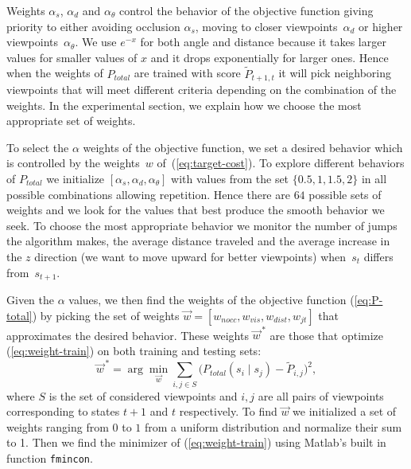 \documentclass[10pt,twocolumn,letterpaper]{article}
\begin{document}
Weights $\alpha_{s}$, $\alpha_{d}$ and $\alpha_{\theta}$ control the behavior of the objective function giving priority to either avoiding occlusion $\alpha_{s}$, moving to closer viewpoints~$\alpha_{d}$ or higher viewpoints~$\alpha_{\theta}$. 
We use $e^{-x}$ for both angle and distance because it takes larger values for smaller values of $x$ and it drops exponentially for larger ones. 
Hence when the weights of $P_{total}$ are trained with score $\tilde{P}_{t+1,t}$ it will pick neighboring viewpoints that will meet different criteria depending on the combination of the weights. 
In the experimental section, we explain how we choose the most appropriate set of weights.

To select the $\alpha$ weights of the objective function, we set a desired behavior which is controlled by the weights~$w$ of~(\ref{eq:target-cost}). 
To explore different behaviors of $P_{total}$ we initialize $[\alpha_{s}, \alpha_{d}, \alpha_{\theta}]$ with values from the set $\{0.5,1,1.5,2\}$ in all possible combinations allowing repetition. 
Hence there are $64$ possible sets of weights and we look for the values that best produce the smooth behavior we seek. 
To choose the most appropriate behavior we monitor the number of jumps the algorithm makes, the average distance traveled and the average increase in the $z$ direction (we want to move upward for better viewpoints) when~$s_{t}$ differs from~$s_{t+1}$. 

Given the $\alpha$ values, we then find the weights of the objective function  (\ref{eq:P-total}) by picking the set of weights $\vec{w}=[w_{nocc},w_{vis},w_{dist},w_{jt}]$ that approximates the desired behavior. 
These weights $\vec{w}^{\,\ast}$ are those that optimize (\ref{eq:weight-train}) on both training and testing sets:
\begin{equation} \label{eq:weight-train}
  \vec{w}^{\,\ast} =  
     \arg \min_{\vec{w}}\sum_{i,j \in S} 
     \big(P_{total}(s_i \mid s_j)-\tilde{P}_{i,j} \big)^2,
\end{equation}
where $S$ is the set of considered viewpoints and $i,j$ are all pairs of viewpoints corresponding to states $t+1$ and $t$ respectively. 
To find $\vec{w}$ we initialized a set of weights ranging from $0$ to $1$ from a uniform distribution and normalize their sum to 1. 
Then we find the minimizer of (\ref{eq:weight-train}) using Matlab's built in function \texttt{fmincon}.  
\end{document}
